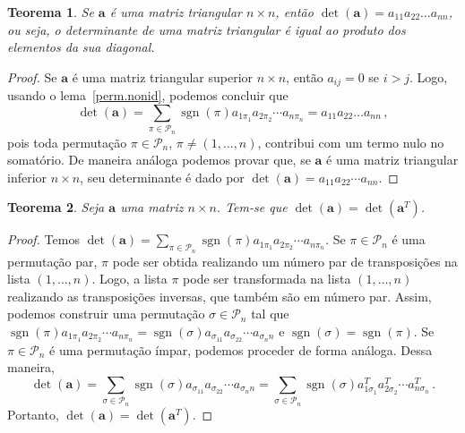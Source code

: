 \documentclass[12pt,a4paper]{report}
\newcommand{\mb}{\mathbf}
\newcommand{\mc}{\mathcal}
\newtheorem{thm}{Teorema}[chapter]
\DeclareMathOperator{\sgn}{sgn}
\begin{document}
\begin{thm}
  Se $\mb a$ é uma matriz triangular $n\times n$, então $\det(\mb a)=a_{11}a_{22}\ldots a_{nn}$, ou seja, o determinante de uma matriz triangular é igual ao produto dos elementos da sua diagonal.
\end{thm}
\begin{proof}
  Se $\mb a$ é uma matriz triangular superior $n\times n$, então $a_{ij}=0$ se $i>j$. Logo, usando o lema~\ref{perm.nonid}, podemos concluir que
  $$\det(\mb a)=\sum_{\pi\in\mc P_n}\sgn(\pi)a_{1\pi_1}a_{2\pi_2}\cdots a_{n\pi_n}=a_{11}a_{22}\ldots a_{nn}\,,$$
  pois toda permutação $\pi\in\mc P_n$, $\pi\ne (1,\ldots,n)$, contribui com um termo nulo no somatório. De maneira análoga podemos provar que, se $\mb a$ é uma matriz triangular inferior $n\times n$, seu determinante é dado por $\det(\mb a)=a_{11}a_{22}\cdots a_{nn}$.
\end{proof}

\begin{thm}
  Seja $\mb a$ uma matriz $n\times n$. Tem-se que $\det (\mb a)=\det (\mb a^T)$.
\end{thm}
\begin{proof}
  Temos $\det(\mb a)=\sum_{\pi\in\mc P_n}\sgn(\pi)a_{1\pi_1}a_{2\pi_2}\cdots a_{n\pi_n}$. Se $\pi\in\mc P_n$ é uma permutação par, $\pi$ pode ser obtida realizando um número par de transposições na lista $(1,\ldots,n)$. Logo, a lista $\pi$ pode ser transformada na lista $(1,\ldots,n)$ realizando as transposições inversas, que também são em número par.
  Assim, podemos construir uma permutação $\sigma\in\mc P_n$ tal que $\sgn(\pi)a_{1\pi_1}a_{2\pi_2}\cdots a_{n\pi_n}=\sgn(\sigma)a_{\sigma_11}a_{\sigma_22}\cdots a_{\sigma_nn}$ e $\sgn(\sigma)=\sgn(\pi)$. Se $\pi\in\mc P_n$ é uma permutação ímpar, podemos proceder de forma análoga. Dessa maneira,
  $$\det(\mb a)=\sum_{\sigma\in\mc P_n}\sgn(\sigma)a_{\sigma_11}a_{\sigma_22}\cdots a_{\sigma_nn}=\sum_{\sigma\in\mc P_n}\sgn(\sigma)a^T_{1\sigma_1}a^T_{2\sigma_2}\cdots a^T_{n\sigma_n}\,.$$
  Portanto, $\det(\mb a)=\det(\mb a^T)$.
\end{proof}
\end{document}
